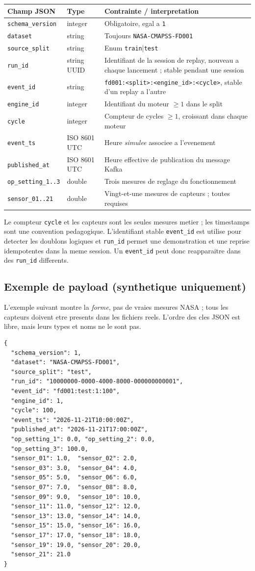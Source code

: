 \documentclass[10pt,a4paper]{article}
\newcommand{\code}[1]{{\small\ttfamily\nolinkurl{#1}}}
\begin{document}
\begin{tabularx}{\linewidth}{@{}p{35mm}p{22mm}Y@{}}
\toprule
\textbf{Champ JSON} & \textbf{Type} & \textbf{Contrainte / interpretation}\\\midrule
\code{schema_version} & integer & Obligatoire, egal a \code{1}\\
\code{dataset} & string & Toujours \code{NASA-CMAPSS-FD001}\\
\code{source_split} & string & Enum \code{train}|\code{test}\\
\code{run_id} & string UUID & Identifiant de la session de replay, nouveau a chaque lancement ; stable pendant une session\\
\code{event_id} & string & \code{fd001:<split>:<engine_id>:<cycle>}, stable d'un replay a l'autre\\
\code{engine_id} & integer & Identifiant du moteur \(\geq 1\) dans le split\\
\code{cycle} & integer & Compteur de cycles \(\geq 1\), croissant dans chaque moteur\\
\code{event_ts} & ISO 8601 UTC & Heure \emph{simulee} associee a l'evenement\\
\code{published_at} & ISO 8601 UTC & Heure effective de publication du message Kafka\\
\code{op_setting_1..3} & double & Trois mesures de reglage du fonctionnement\\
\code{sensor_01..21} & double & Vingt-et-une mesures de capteurs ; toutes requises\\
\bottomrule
\end{tabularx}
Le compteur \code{cycle} et les capteurs sont les seules mesures metier ; les timestamps sont une convention pedagogique. L'identifiant stable \code{event_id} est utilise pour detecter les doublons logiques et \code{run_id} permet une demonstration et une reprise idempotentes dans la meme session. Un \code{event_id} peut donc reapparaitre dans des \code{run_id} differents.

\subsection{Exemple de payload (synthetique uniquement)}
L'exemple suivant montre la \emph{forme}, pas de vraies mesures NASA ; tous les capteurs doivent etre presents dans les fichiers reels. L'ordre des cles JSON est libre, mais leurs types et noms ne le sont pas.
\begin{lstlisting}
{
  "schema_version": 1,
  "dataset": "NASA-CMAPSS-FD001",
  "source_split": "test",
  "run_id": "10000000-0000-4000-8000-000000000001",
  "event_id": "fd001:test:1:100",
  "engine_id": 1,
  "cycle": 100,
  "event_ts": "2026-11-21T10:00:00Z",
  "published_at": "2026-11-21T17:00:00Z",
  "op_setting_1": 0.0, "op_setting_2": 0.0,
  "op_setting_3": 100.0,
  "sensor_01": 1.0,  "sensor_02": 2.0,
  "sensor_03": 3.0,  "sensor_04": 4.0,
  "sensor_05": 5.0,  "sensor_06": 6.0,
  "sensor_07": 7.0,  "sensor_08": 8.0,
  "sensor_09": 9.0,  "sensor_10": 10.0,
  "sensor_11": 11.0, "sensor_12": 12.0,
  "sensor_13": 13.0, "sensor_14": 14.0,
  "sensor_15": 15.0, "sensor_16": 16.0,
  "sensor_17": 17.0, "sensor_18": 18.0,
  "sensor_19": 19.0, "sensor_20": 20.0,
  "sensor_21": 21.0
}
\end{lstlisting}
\end{document}
